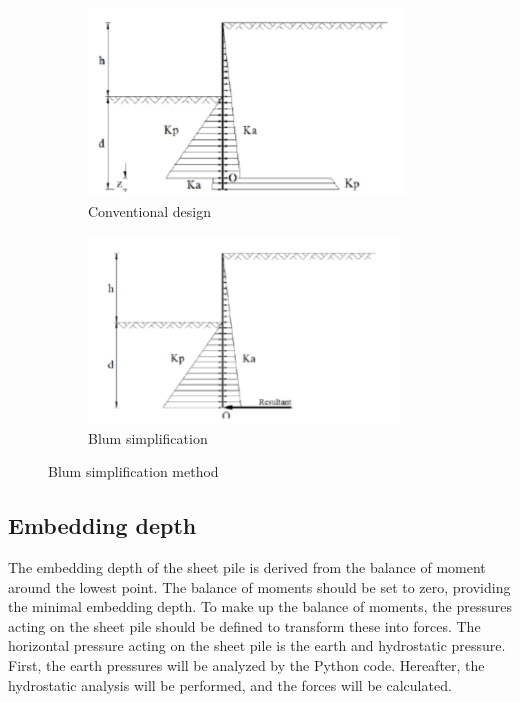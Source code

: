 \begin{figure}[H]
    \centering
    \begin{subfigure}[b]{0.45\textwidth}
        \includegraphics[width=\linewidth, height=5cm]{figures/ch8/blum_1.png}
        \caption{Conventional design}
        \label{fig:conventional_design}
    \end{subfigure}
    \hfill
    \begin{subfigure}[b]{0.45\textwidth}
        \includegraphics[width=\linewidth, height=5cm]{figures/ch8/blum_2.png}
        \caption{Blum simplification}
        \label{fig:blum_simplification}
    \end{subfigure}
    \caption{Blum simplification method}
    \label{fig:blum}
\end{figure}



\subsection{Embedding depth}

The embedding depth of the sheet pile is derived from the balance of moment around the lowest point. The balance of moments should be set to zero, providing the minimal embedding depth. To make up the balance of moments, the pressures acting on the sheet pile should be defined to transform these into forces. The horizontal pressure acting on the sheet pile is the earth and hydrostatic pressure. First, the earth pressures will be analyzed by the Python code. Hereafter, the hydrostatic analysis will be performed, and the forces will be calculated. 

